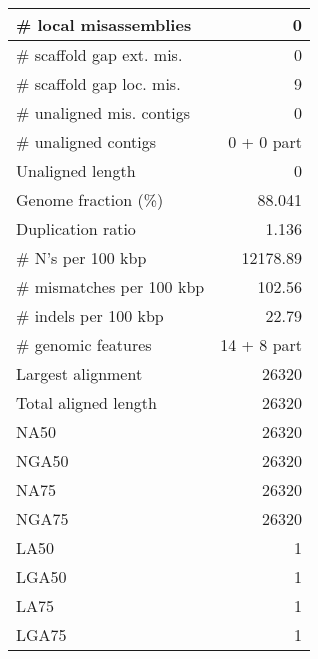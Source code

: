 \documentclass[12pt,a4paper]{article}
\begin{document}
\begin{table}[ht]
\begin{center}
\begin{tabular}{|l*{1}{|r}|}
\# local misassemblies & 0 \\ \hline
\# scaffold gap ext. mis. & 0 \\ \hline
\# scaffold gap loc. mis. & 9 \\ \hline
\# unaligned mis. contigs & 0 \\ \hline
\# unaligned contigs & 0 + 0 part \\ \hline
Unaligned length & 0 \\ \hline
Genome fraction (\%) & 88.041 \\ \hline
Duplication ratio & 1.136 \\ \hline
\# N's per 100 kbp & 12178.89 \\ \hline
\# mismatches per 100 kbp & 102.56 \\ \hline
\# indels per 100 kbp & 22.79 \\ \hline
\# genomic features & 14 + 8 part \\ \hline
Largest alignment & 26320 \\ \hline
Total aligned length & 26320 \\ \hline
NA50 & 26320 \\ \hline
NGA50 & 26320 \\ \hline
NA75 & 26320 \\ \hline
NGA75 & 26320 \\ \hline
LA50 & 1 \\ \hline
LGA50 & 1 \\ \hline
LA75 & 1 \\ \hline
LGA75 & 1 \\ \hline
\end{tabular}
\end{center}
\end{table}
\end{document}

